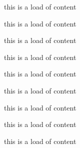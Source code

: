   this is a load of content
  
  this is a load of content
  
  this is a load of content
  
  this is a load of content
  
  this is a load of content
  
  this is a load of content
  
  this is a load of content
  
  this is a load of content
  
  this is a load of content
  
  \begin{figure}
    \centering

\end{figure}
